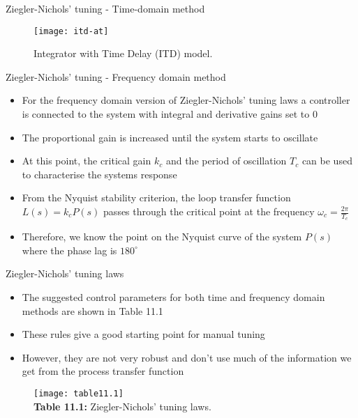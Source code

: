 \documentclass{beamer-control}
\begin{document}
\begin{frame}{Ziegler-Nichols' tuning - Time-domain method}
\begin{figure}
	\centering
	\texttt{[image: itd-at]}
	\caption{Integrator with Time Delay (ITD) model.}
\end{figure}
\end{frame}

\begin{frame}{Ziegler-Nichols' tuning - Frequency domain method}
\begin{itemize}
	\item For the frequency domain version of Ziegler-Nichols' tuning laws a controller is connected to the system with integral and derivative gains set to $0$
	\item The proportional gain is increased until the system starts to oscillate
	\item At this point, the critical gain $k_c$ and the period of oscillation $T_c$ can be used to characterise the systems response
	\item From the Nyquist stability criterion, the loop transfer function $L(s)=k_cP(s)$ passes through the critical point at the frequency $\omega_c=\tfrac{2\pi}{T_c}$
	\item Therefore, we know the point on the Nyquist curve of the system $P(s)$ where the phase lag is $180^\circ$
\end{itemize}
\end{frame}


\begin{frame}{Ziegler-Nichols' tuning laws}
\begin{itemize}
	\item The suggested control parameters for both time and frequency domain methods are shown in Table 11.1
	\item These rules give a good starting point for manual tuning
	\item However, they are not very robust and don't use much of the information we get from the process transfer function
\end{itemize}
\begin{figure}
	\centering
	\texttt{[image: table11.1]}
	\\
	\textbf{Table 11.1:} Ziegler-Nichols' tuning laws. 
\end{figure}
\end{frame}
\end{document}
